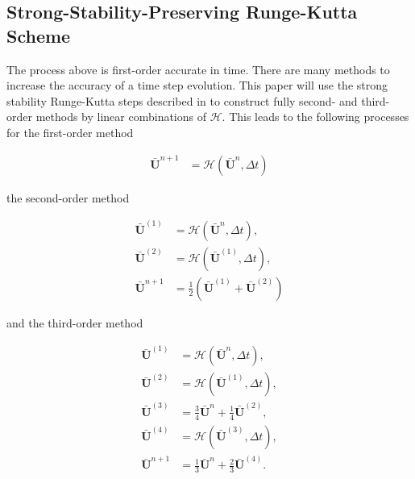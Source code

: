 \documentclass[SingleSpace,12pt,Proceedings]{Serre_ASCE}
\begin{document}
\subsection{Strong-Stability-Preserving Runge-Kutta Scheme} %
The process above is first-order accurate in time. There are many methods to increase the accuracy of a time step evolution. This paper will use the strong stability Runge-Kutta steps described in  to construct fully second- and third-order methods by linear combinations of $\mathcal{H}$. This leads to the following processes for the first-order method
\begin{linenomath*}
\begin{align*}
\boldsymbol{\bar{U}}^{n+1} &= \mathcal{H}\left(\boldsymbol{\bar{U}}^{n},\Delta t\right)
\end{align*}
\end{linenomath*}
the second-order method
\begin{linenomath*}
\begin{align*}
\boldsymbol{\bar{U}}^{\left(1\right)} &= \mathcal{H}\left(\boldsymbol{\bar{U}}^{n},\Delta t\right), \\
\boldsymbol{\bar{U}}^{\left(2\right)} &= \mathcal{H}\left(\boldsymbol{\bar{U}}^{\left(1\right)},\Delta t\right), \\
\boldsymbol{\bar{U}}^{n+1} &=\frac{1}{2}\left(\boldsymbol{\bar{U}}^{\left(1\right)} + \boldsymbol{\bar{U}}^{\left(2\right)}  \right)
\end{align*}
\end{linenomath*}
and the third-order method
\begin{linenomath*}
\begin{align*}
\boldsymbol{\bar{U}}^{\left(1\right)} &= \mathcal{H}\left(\boldsymbol{\bar{U}}^{n},\Delta t\right), \\
\boldsymbol{\bar{U}}^{\left(2\right)} &= \mathcal{H}\left(\boldsymbol{\bar{U}}^{\left(1\right)},\Delta t\right), \\
\boldsymbol{\bar{U}}^{\left(3\right)} &= \frac{3}{4}\boldsymbol{\bar{U}}^{n} + \frac{1}{4}\boldsymbol{\bar{U}}^{\left(2\right)} , \\
\boldsymbol{\bar{U}}^{\left(4\right)} &= \mathcal{H}\left(\boldsymbol{\bar{U}}^{\left(3\right)},\Delta t\right), \\
\boldsymbol{\bar{U}}^{n+1} &= \frac{1}{3}\boldsymbol{\bar{U}}^{n} + \frac{2}{3}\boldsymbol{\bar{U}}^{\left(4\right)}.
\end{align*}
\end{linenomath*}
\end{document}
